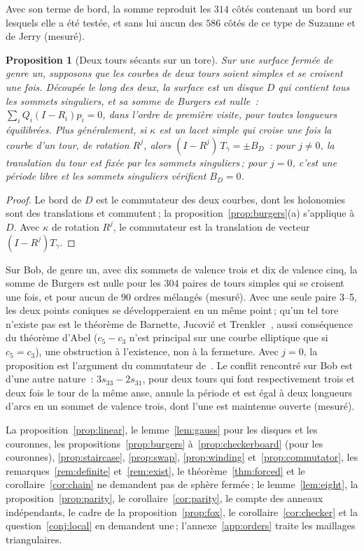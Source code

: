 \documentclass[11pt,a4paper]{article}
\newtheorem{proposition}{Proposition}
\newcommand{\shift}{s}
\begin{document}
Avec son terme de bord, la somme reproduit les $314$ côtés contenant un bord
sur lesquels elle a été testée, et sans lui aucun des $586$ côtés de ce type
de Suzanne et de Jerry (mesuré).

\begin{proposition}[Deux tours sécants sur un tore]\label{prop:torus}
Sur une surface fermée de genre un, supposons que les courbes de deux tours
soient simples et se croisent une fois. Découpée le long des deux, la surface
est un disque $D$ qui contient tous les sommets singuliers, et sa somme de
Burgers est nulle~: $\sum_i Q_i (I - R_i) p_i = 0$, dans l'ordre de première
visite, pour toutes longueurs équilibrées. Plus généralement, si $\kappa$ est
un lacet simple qui croise une fois la courbe d'un tour, de rotation $R^j$,
alors $(I - R^j)\,T_\gamma = \pm B_D$~: pour $j \neq 0$, la translation du
tour est fixée par les sommets singuliers\,; pour $j = 0$, c'est une période
libre et les sommets singuliers vérifient $B_D = 0$.
\end{proposition}
\begin{proof}
Le bord de $D$ est le commutateur des deux courbes, dont les holonomies sont
des translations et commutent\,; la proposition~\ref{prop:burgers}(a)
s'applique à $D$. Avec $\kappa$ de rotation $R^j$, le commutateur est la
translation de vecteur $(I - R^j)T_\gamma$.
\end{proof}

Sur Bob, de genre un, avec dix sommets de valence trois et dix de valence
cinq, la somme de Burgers est nulle pour les $304$ paires de tours simples qui
se croisent une fois, et pour aucun de $90$ ordres mélangés (mesuré). Avec une
seule paire 3--5, les deux points coniques se développeraient en un même
point\,; qu'un tel tore n'existe pas est le théorème de Barnette, Jucovi\v{c}
et Trenkler~\cite{barnette1971toroidal}, aussi conséquence du théorème d'Abel
($c_5 - c_3$ n'est principal sur une courbe elliptique que si $c_5 = c_3$),
une obstruction à l'existence, non à la fermeture. Avec $j = 0$, la
proposition est l'argument du commutateur de~\cite[\S7]{izmestiev2013torus}.
Le conflit rencontré sur Bob est d'une autre nature~: $3\shift_{33} -
2\shift_{31}$, pour deux tours qui font respectivement trois et deux fois le
tour de la même anse, annule la période et est égal à deux longueurs d'arcs en
un sommet de valence trois, dont l'une est maintenue ouverte (mesuré).

La proposition~\ref{prop:linear}, le lemme~\ref{lem:gauss} pour les disques et
les couronnes, les propositions~\ref{prop:burgers} à~\ref{prop:checkerboard}
(pour les couronnes), \ref{prop:staircase}, \ref{prop:swap},
\ref{prop:winding} et~\ref{prop:commutator}, les
remarques~\ref{rem:definite} et~\ref{rem:exist}, le
théorème~\ref{thm:forced} et le corollaire~\ref{cor:chain} ne demandent pas de
sphère fermée\,; le lemme~\ref{lem:eight}, la proposition~\ref{prop:parity},
le corollaire~\ref{cor:parity}, le compte des anneaux indépendants, le cadre
de la proposition~\ref{prop:fox}, le corollaire~\ref{cor:checker} et la
question~\ref{conj:local} en demandent une\,; l'annexe~\ref{app:orders} traite
les maillages triangulaires.
\end{document}
